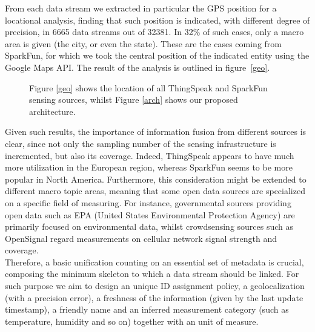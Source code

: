 From each data stream we extracted in particular the GPS position for a locational analysis, finding that such position is indicated, with different degree of precision, in 6665 data streams out of 32381.
In 32\% of such cases, only a macro area is given (the city, or even the state).
These are the cases coming from SparkFun, for which we took the central position of the indicated entity using the Google Maps API.
The result of the analysis is outlined in figure~\ref{geo}.

\begin{figure}[!t]
\centering
{}
\caption{Figure \ref{geo} shows the location of all ThingSpeak and SparkFun sensing sources, whilst Figure \ref{arch} shows our proposed architecture.}
\end{figure}

Given such results, the importance of information fusion from different sources is clear, since not only the sampling number of the sensing infrastructure is incremented, but also its coverage.
Indeed, ThingSpeak appears to have much more utilization in the European region, whereas SparkFun seems to be more popular in North America.
Furthermore, this consideration might be extended to different macro topic areas, meaning that some open data sources are specialized on a specific field of measuring.
For instance, governmental sources providing open data such as EPA (United States Environmental Protection Agency) \cite{epa} are primarily focused on environmental data, whilst crowdsensing sources such as OpenSignal \cite{opensignal} regard measurements on cellular network signal strength and coverage.
\\
Therefore, a basic unification counting on an essential set of metadata is crucial, composing the minimum skeleton to which a data stream should be linked.
For such purpose we aim to design an unique ID assignment policy, a geolocalization (with a precision error), a freshness of the information (given by the last update timestamp), a friendly name and an inferred measurement category (such as temperature, humidity and so on) together with an unit of measure.

